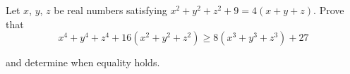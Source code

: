 Let $ x$,  $ y$,  $ z$ be real numbers satisfying $ x^2+y^2+z^2+9=4(x+y+z)$. Prove that\[ x^4+y^4+z^4+16(x^2+y^2+z^2) \ge 8(x^3+y^3+z^3)+27\]

and determine when equality holds.